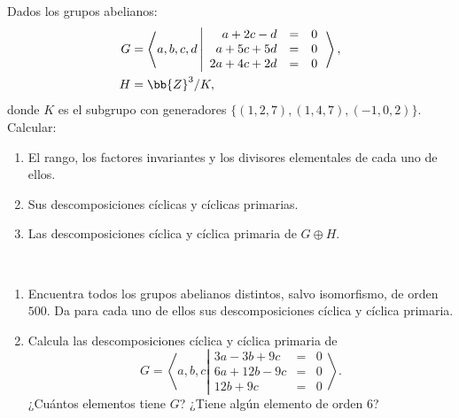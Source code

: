 \begin{ejercicio}\label{ej:7.9}
    Dados los grupos abelianos:
    \begin{align*}
        G &= \left\langle a, b, c, d \left|
            \begin{array}{rcl}
                a + 2c - d &=& 0 \\
                a + 5c + 5d &=& 0 \\
                2a + 4c + 2d &=& 0
            \end{array}
        \right.\right\rangle,\\
        H &= \bb{Z}^3/K,
    \end{align*}
    donde $K$ es el subgrupo con generadores $\{(1, 2, 7),(1, 4, 7),(-1, 0, 2)\}$. Calcular:
    \begin{enumerate}
        \item El rango, los factores invariantes y los divisores elementales de cada uno de ellos.
        \item Sus descomposiciones cíclicas y cíclicas primarias.
        \item Las descomposiciones cíclica y cíclica primaria de $G \oplus H$.
    \end{enumerate}
\end{ejercicio}

\begin{ejercicio}\label{ej:7.10}~
    \begin{enumerate}
        \item Encuentra todos los grupos abelianos distintos, salvo isomorfismo, de orden $500$. Da para cada uno de ellos sus descomposiciones cíclica y cíclica primaria.
        \item Calcula las descomposiciones cíclica y cíclica primaria de
        \begin{equation*}
            G = \left\langle a, b, c \left|
                \begin{array}{rcl}
                    3a - 3b + 9c &=& 0 \\
                    6a + 12b - 9c &=& 0 \\
                    12b + 9c &=& 0
                \end{array}
            \right.\right\rangle.
        \end{equation*}
        ¿Cuántos elementos tiene $G$? ¿Tiene algún elemento de orden $6$?
    \end{enumerate}
\end{ejercicio}

